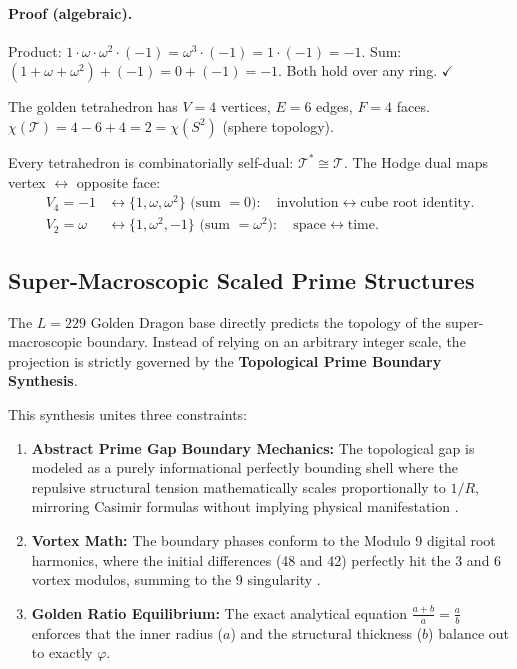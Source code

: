 \paragraph{Proof (algebraic).}
Product: $1 \cdot \omega \cdot \omega^2 \cdot (-1)
= \omega^3 \cdot (-1) = 1 \cdot (-1) = -1$.
Sum: $(1 + \omega + \omega^2) + (-1) = 0 + (-1) = -1$.
Both hold over any ring. $\checkmark$

\begin{result}
The golden tetrahedron has $V = 4$ vertices, $E = 6$ edges,
$F = 4$ faces.
$\chi(\mathcal{T}) = 4 - 6 + 4 = 2 = \chi(S^2)$ (sphere topology).

Every tetrahedron is combinatorially self-dual: $\mathcal{T}^* \cong \mathcal{T}$.
The Hodge dual maps vertex $\leftrightarrow$ opposite face:
\begin{align}
  V_4 = -1 &\longleftrightarrow \{1, \omega, \omega^2\} \text{ (sum } = 0\text{)}: \quad
    \text{involution} \leftrightarrow \text{cube root identity.} \\
  V_2 = \omega &\longleftrightarrow \{1, \omega^2, -1\} \text{ (sum } = \omega^2\text{)}: \quad
    \text{space} \leftrightarrow \text{time.}
\end{align}
\end{result}

\subsection{Super-Macroscopic Scaled Prime Structures}
\label{sec:super_macro_scaled}

The $L=229$ Golden Dragon base directly predicts the topology of the super-macroscopic boundary. Instead of relying on an arbitrary integer scale, the projection is strictly governed by the \textbf{Topological Prime Boundary Synthesis}. 

This synthesis unites three constraints:
\begin{enumerate}
    \item \textbf{Abstract Prime Gap Boundary Mechanics:} The topological gap is modeled as a purely informational perfectly bounding shell where the repulsive structural tension mathematically scales proportionally to $1/R$, mirroring Casimir formulas without implying physical manifestation \cite{lockwood_zpe2025}.
    \item \textbf{Vortex Math:} The boundary phases conform to the Modulo 9 digital root harmonics, where the initial differences (48 and 42) perfectly hit the 3 and 6 vortex modulos, summing to the 9 singularity \cite{larue_chromatic}.
    \item \textbf{Golden Ratio Equilibrium:} The exact analytical equation $\frac{a+b}{a} = \frac{a}{b}$ enforces that the inner radius ($a$) and the structural thickness ($b$) balance out to exactly $\varphi$.
\end{enumerate}

